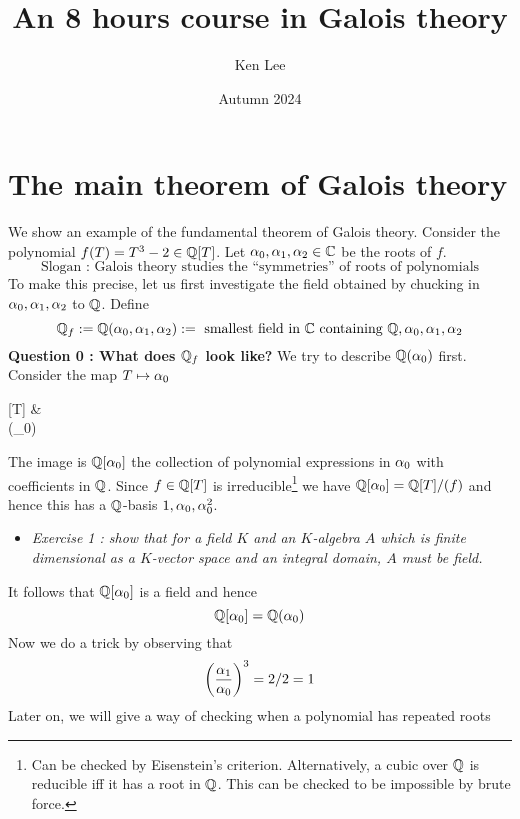 \documentclass{article}
\begin{document}
\title{An 8 hours course in Galois theory}

\author{Ken Lee}
\date{Autumn 2024}
\maketitle

\tableofcontents

\section{The main theorem of Galois theory}

We show an example of the fundamental theorem of Galois theory.
Consider the polynomial $f(T) = T^3 - 2 \in \mathbb{Q}[T]$.
Let $\alpha_0 , \alpha_1 , \alpha_2 \in \mathbb{C}$ be the roots of $f$.
\[
  \text{Slogan : Galois theory studies the ``symmetries'' of 
  roots of polynomials}
\]
To make this precise, let us first investigate the field obtained
by chucking in $\alpha_0 , \alpha_1 , \alpha_2$ to $\mathbb{Q}$.
Define \[
  \mathbb{Q}_f := \mathbb{Q}(\alpha_0 , \alpha_1 , \alpha_2) := 
  \text{ smallest field in $\mathbb{C}$ containing $\mathbb{Q} , \alpha_0 , \alpha_1 ,\alpha_2$}
\]
\textbf{Question 0 : What does $\mathbb{Q}_f$ look like?}
We try to describe $\mathbb{Q}(\alpha_0)$ first.
Consider the map $T \mapsto \alpha_0$ 
\begin{cd}
	{} & {} \\
	{(\alpha_0)}
	\arrow["{T \mapsto \al_0}", from=1-1, to=1-2]
	\arrow[dashed, from=1-1, to=2-1]
	\arrow["\subseteq"', from=2-1, to=1-2]
\end{cd}
The image is $\mathbb{Q}[\alpha_0]$ the collection of polynomial expressions
in $\alpha_0$ with coefficients in $\mathbb{Q}$.
Since $f \in \mathbb{Q}[T]$ is irreducible\footnote{
  Can be checked by Eisenstein's criterion.
  Alternatively, a cubic over $\mathbb{Q}$ is reducible iff
  it has a root in $\mathbb{Q}$.
  This can be checked to be impossible by brute force.
}
we have $\mathbb{Q}[\alpha_0] = \mathbb{Q}[T] / (f)$
and hence this has a $\mathbb{Q}$-basis $1 , \alpha_0 , \alpha_0^2$.
\begin{itemize}
  \item \textit{
    Exercise 1 :  show that for a field $K$ and 
    an $K$-algebra $A$ which is finite dimensional 
    as a $K$-vector space and an integral domain,
    $A$ must be field.
  }
\end{itemize}
It follows that $\mathbb{Q}[\alpha_0]$ is a field and hence
\[
  \mathbb{Q}[\alpha_0] = \mathbb{Q}(\alpha_0)
\]
Now we do a trick by observing that \[
  \left(\frac{\alpha_1}{\alpha_0}\right)^3 = 2 / 2 = 1
\]
Later on, we will give a way of checking when a polynomial has repeated roots
\end{document}
